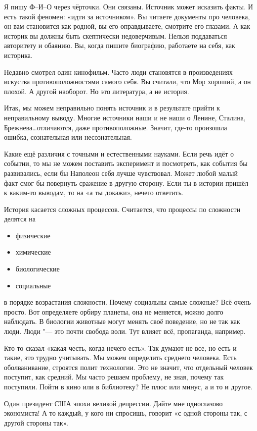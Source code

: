 Я пишу Ф--И--О через чёрточки. Они связаны. Источник может исказить факты. И есть такой феномен: «идти за источником». Вы читаете документы про человека, он вам становится как родной, вы его оправдываете, смотрите его глазами. А как историк вы должны быть скептически недоверчивым. Нельзя поддаваться авторитету и обаянию. Вы, когда пишите биографию, работаете на себя, как историка.

Недавно смотрел один кинофильм. Часто люди становятся в произведениях искуства противоположностями самого себя. Вы считали, что Мор хороший, а он плохой. А другой наоборот. Но это литература, а не история.

Итак, мы можем неправильно понять источник и в результате прийти к неправильному выводу. Многие источники наши и не наши о Ленине, Сталина, Брежнева\dots отличаются, даже противоположные. Значит, где-то произошла ошибка, сознательная или несознательная.

Какие ещё различия с точными и естественными науками. Если речь идёт о событии, то мы не можем поставить эксперимент и посмотреть, как события бы развивались, если бы Наполеон себя лучше чувствовал. Может любой малый факт смог бы повернуть сражение в другую сторону. Если ты в истории пришёл к каким-то выводам, то на «а ты докажи», нечего ответить.

История касается сложных процессов. Считается, что процессы по сложности делятся на
\begin{itemize}
\item физические
\item химические
\item биологические
\item социальные
\end{itemize}
в порядке возрастания сложности. Почему социальны самые сложные? Всё очень просто. Вот определяете орбиру планеты, она не меняется, можно долго наблюдать. В биологии животные могут менять своё поведение, но не так как люди. Люди "--- это почти свобода воли. Тут влияет всё, пропаганда, например.

Кто-то сказал «какая честь, когда нечего есть». Так думают не все, но есть и такие, это трудно учитывать. Мы можем определить среднего человека. Есть оболванивание, строятся полит технологии. Это не значит, что отдельный человек поступит, как средний. Мы часто решаем проблему, не зная, почему так поступили. Пойти в кино или в библиотеку? Не плюс или минус, а и то и другое.

Один президент США эпохи великой депрессии.
Дайте мне одноглазово экономиста! А то каждый, у кого ни спросишь, говорит «с одной стороны так, с другой стороны так».

